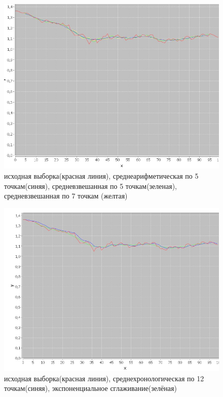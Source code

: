 \documentclass[a4paper,12pt]{article}
\begin{document}
\begin{center}
	\begin{figure}[h]
		\centering
   		\includegraphics[scale=0.9]{figure_1.png}
   		\caption{исходная выборка(красная линия), среднеарифметическая по 5 точкам(синяя), средневзвешанная по 5 точкам(зеленая), средневзвешанная по 7 точкам (желтая)}
   		\label{fig:im_1}
    \end{figure}
\end{center}
\newpage
\begin{center}
	\begin{figure}[h]
		\centering
   		\includegraphics[scale=0.9]{figure_2.png}
   		\caption{исходная выборка(красная линия), среднехронологическая по 12 точкам(синяя), экспоненциальное сглаживание(зелёная)}
   		\label{fig:im_2}
    \end{figure}
\end{center}
\end{document}
